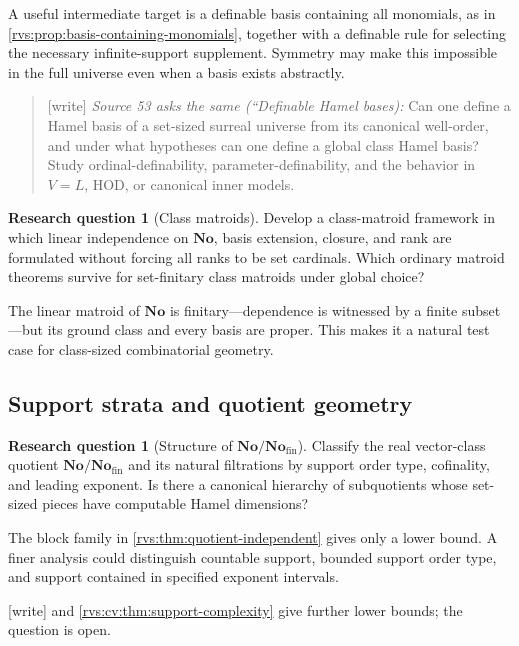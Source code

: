 \documentclass[11pt,letterpaper]{article}
\numberwithin{equation}{section}
\theoremstyle{definition}
\newtheorem{question}[theorem]{Research question}
\theoremstyle{remark}
\newcommand{\No}{\mathbf{No}}
\newcommand{\Fin}{\No_{\mathrm{fin}}}
\newcommand{\wtag}{\textup{[write]}}%
\begin{document}
A useful intermediate target is a definable basis containing all monomials,
as in \cref{rvs:prop:basis-containing-monomials}, together with a definable rule
for selecting the necessary infinite-support supplement.  Symmetry may make
this impossible in the full universe even when a basis exists abstractly.
\begin{quote}\small
\wtag{} \emph{Source 53 asks the same (``Definable Hamel bases):}
Can one define a Hamel basis of a set-sized surreal universe from its canonical
well-order, and under what hypotheses can one define a global class Hamel basis?
Study ordinal-definability, parameter-definability, and the behavior in $V=L$,
HOD, or canonical inner models.
\end{quote}


\begin{question}[Class matroids]
Develop a class-matroid framework in which linear independence on \(\No\),
basis extension, closure, and rank are formulated without forcing all ranks
to be set cardinals.  Which ordinary matroid theorems survive for set-finitary
class matroids under global choice?
\end{question}

The linear matroid of \(\No\) is finitary---dependence is witnessed by a
finite subset---but its ground class and every basis are proper.  This makes
it a natural test case for class-sized combinatorial geometry.

\subsection{Support strata and quotient geometry}

\begin{question}[Structure of \(\No/\Fin\)]
Classify the real vector-class quotient \(\No/\Fin\) and its natural
filtrations by support order type, cofinality, and leading exponent.  Is there
a canonical hierarchy of subquotients whose set-sized pieces have computable
Hamel dimensions?
\end{question}

The block family in \cref{rvs:thm:quotient-independent} gives only a lower bound.
A finer analysis could distinguish countable support, bounded support order
type, and support contained in specified exponent intervals.

\noindent\wtag{}  and
\cref{rvs:cv:thm:support-complexity} give further lower bounds; the
question is open.
\end{document}
